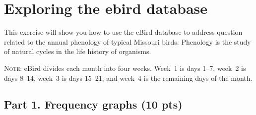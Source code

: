 \documentclass[12pt]{article}
\begin{document}
\thispagestyle{plain}

\section*{Exploring the ebird database}

This exercise will show you how to use the eBird database to address question related to the annual phenology of typical Missouri birds. Phenology is the study of natural cycles in the life history of organisms. 

\textsc{Note:} eBird divides each month into four weeks. Week~1 is days 1–7, week~2 is days 8–14, week~3 is days 15–21, and week~4 is the remaining days of the month. 

\subsection*{Part 1. Frequency graphs (10 pts)}
\end{document}
